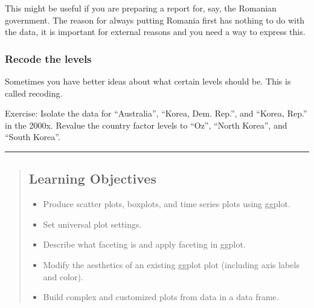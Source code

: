 \documentclass[]{book}
\newenvironment{Shaded}{\begin{snugshade}}{\end{snugshade}}
\newcommand{\KeywordTok}[1]{\textcolor[rgb]{0.13,0.29,0.53}{\textbf{#1}}}
\newcommand{\StringTok}[1]{\textcolor[rgb]{0.31,0.60,0.02}{#1}}
\newcommand{\OperatorTok}[1]{\textcolor[rgb]{0.81,0.36,0.00}{\textbf{#1}}}
\newcommand{\NormalTok}[1]{#1}
\providecommand{\tightlist}{%
  \setlength{\itemsep}{0pt}\setlength{\parskip}{0pt}}
\begin{document}
This might be useful if you are preparing a report for, say, the
Romanian government. The reason for always putting Romania first has
nothing to do with the data, it is important for external reasons and
you need a way to express this.

\subsubsection{Recode the levels}\label{recode-the-levels}

Sometimes you have better ideas about what certain levels should be.
This is called recoding.

\begin{Shaded}
\end{Shaded}

Exercise: Isolate the data for ``Australia'', ``Korea, Dem. Rep.'', and
``Korea, Rep.'' in the 2000x. Revalue the country factor levels to
``Oz'', ``North Korea'', and ``South Korea''.

\begin{center}\rule{0.5\linewidth}{\linethickness}\end{center}

\begin{quote}
\subsection{Learning Objectives}\label{learning-objectives-4}

\begin{itemize}
\tightlist
\item
  Produce scatter plots, boxplots, and time series plots using ggplot.
\item
  Set universal plot settings.
\item
  Describe what faceting is and apply faceting in ggplot.
\item
  Modify the aesthetics of an existing ggplot plot (including axis
  labels and color).
\item
  Build complex and customized plots from data in a data frame.
\end{itemize}
\end{quote}
\end{document}
